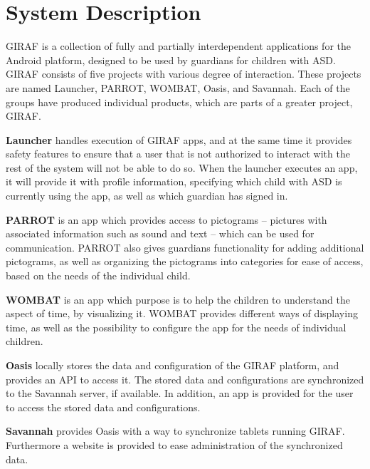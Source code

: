 \section{System Description}
GIRAF is a collection of fully and partially interdependent applications for the Android platform, designed to be used by guardians for children with ASD. GIRAF consists of five projects with various degree of interaction. These projects are named Launcher, PARROT, WOMBAT, Oasis, and Savannah. Each of the groups have produced individual products, which are parts of a greater project, GIRAF. 

\textbf{Launcher} handles execution of GIRAF apps, and at the same time it provides safety features to ensure that a user that is not authorized to interact with the rest of the system will not be able to do so. When the launcher executes an app, it will provide it with profile information, specifying which child with ASD is currently using the app, as well as which guardian has signed in.

\textbf{PARROT} is an app which provides access to pictograms -- pictures with associated information such as sound and text -- which can be used for communication. PARROT also gives guardians functionality for adding additional pictograms, as well as organizing the pictograms into categories for ease of access, based on the needs of the individual child.

\textbf{WOMBAT} is an app which purpose is to help the children to understand the aspect of time, by visualizing it. WOMBAT provides different ways of displaying time, as well as the possibility to configure the app for the needs of individual children. 

\textbf{Oasis} locally stores the data and configuration of the GIRAF platform, and provides an API to access it. The stored data and configurations are synchronized to the Savannah server, if available. In addition, an app is provided for the user to access the stored data and configurations.

\textbf{Savannah} provides Oasis with a way to synchronize tablets running GIRAF. Furthermore a website is provided to ease administration of the synchronized data.